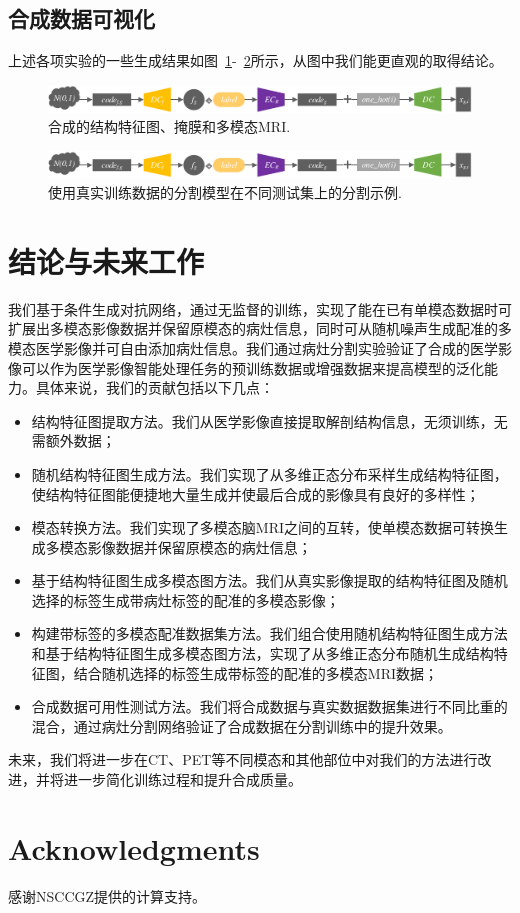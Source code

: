 \documentclass[letterpaper]{article} %
\begin{document}
\subsection{合成数据可视化}
上述各项实验的一些生成结果如图~\ref{generated_f}-~\ref{label_from_diff_test}所示，从图中我们能更直观的取得结论。
\begin{figure}
	\centering
	\includegraphics[width=0.98\linewidth]{figures/make_data}
	\caption{合成的结构特征图、掩膜和多模态MRI.}
	\label{generated_f}
\end{figure}

\begin{figure}
	\centering
	\includegraphics[width=0.98\linewidth]{figures/make_data}
	\caption{使用真实训练数据的分割模型在不同测试集上的分割示例.}
	\label{label_from_diff_test}
\end{figure}

\section{结论与未来工作}

我们基于条件生成对抗网络，通过无监督的训练，实现了能在已有单模态数据时可扩展出多模态影像数据并保留原模态的病灶信息，同时可从随机噪声生成配准的多模态医学影像并可自由添加病灶信息。我们通过病灶分割实验验证了合成的医学影像可以作为医学影像智能处理任务的预训练数据或增强数据来提高模型的泛化能力。具体来说，我们的贡献包括以下几点：
\begin{itemize}
	\item 结构特征图提取方法。我们从医学影像直接提取解剖结构信息，无须训练，无需额外数据；
	\item 随机结构特征图生成方法。我们实现了从多维正态分布采样生成结构特征图，使结构特征图能便捷地大量生成并使最后合成的影像具有良好的多样性；
	\item 模态转换方法。我们实现了多模态脑MRI之间的互转，使单模态数据可转换生成多模态影像数据并保留原模态的病灶信息；
	\item 基于结构特征图生成多模态图方法。我们从真实影像提取的结构特征图及随机选择的标签生成带病灶标签的配准的多模态影像；
	\item 构建带标签的多模态配准数据集方法。我们组合使用随机结构特征图生成方法和基于结构特征图生成多模态图方法，实现了从多维正态分布随机生成结构特征图，结合随机选择的标签生成带标签的配准的多模态MRI数据；
	\item 合成数据可用性测试方法。我们将合成数据与真实数据数据集进行不同比重的混合，通过病灶分割网络验证了合成数据在分割训练中的提升效果。
\end{itemize}

未来，我们将进一步在CT、PET等不同模态和其他部位中对我们的方法进行改进，并将进一步简化训练过程和提升合成质量。	
	

\section{ Acknowledgments}

感谢NSCCGZ提供的计算支持。



\end{document}
